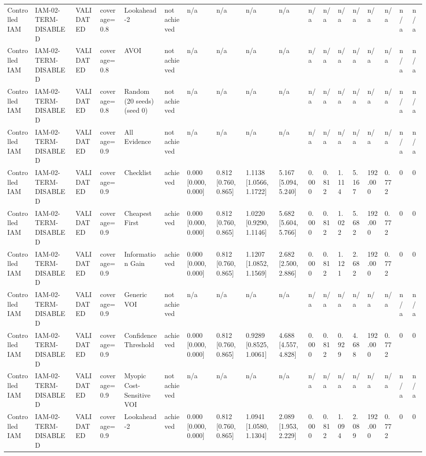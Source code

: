 \begin{table}[!ht]
{\begin{tabular}{llllllllllllllllll}
Controlled IAM & IAM-02-TERM-DISABLED & VALIDATED & coverage=0.8 & Lookahead-2 & not achieved & n/a & n/a & n/a & n/a & n/a & n/a & n/a & n/a & n/a & n/a & n/a & n/a \\
Controlled IAM & IAM-02-TERM-DISABLED & VALIDATED & coverage=0.8 & AVOI & not achieved & n/a & n/a & n/a & n/a & n/a & n/a & n/a & n/a & n/a & n/a & n/a & n/a \\
Controlled IAM & IAM-02-TERM-DISABLED & VALIDATED & coverage=0.8 & Random (20 seeds) (seed 0) & not achieved & n/a & n/a & n/a & n/a & n/a & n/a & n/a & n/a & n/a & n/a & n/a & n/a \\
Controlled IAM & IAM-02-TERM-DISABLED & VALIDATED & coverage=0.9 & All Evidence & not achieved & n/a & n/a & n/a & n/a & n/a & n/a & n/a & n/a & n/a & n/a & n/a & n/a \\
Controlled IAM & IAM-02-TERM-DISABLED & VALIDATED & coverage=0.9 & Checklist & achieved & 0.000 [0.000, 0.000] & 0.812 [0.760, 0.865] & 1.1138 [1.0566, 1.1722] & 5.167 [5.094, 5.240] & 0.000 & 0.812 & 1.114 & 5.167 & 192.000 & 0.772 & 0 & 0 \\
Controlled IAM & IAM-02-TERM-DISABLED & VALIDATED & coverage=0.9 & Cheapest First & achieved & 0.000 [0.000, 0.000] & 0.812 [0.760, 0.865] & 1.0220 [0.9290, 1.1146] & 5.682 [5.604, 5.766] & 0.000 & 0.812 & 1.022 & 5.682 & 192.000 & 0.772 & 0 & 0 \\
Controlled IAM & IAM-02-TERM-DISABLED & VALIDATED & coverage=0.9 & Information Gain & achieved & 0.000 [0.000, 0.000] & 0.812 [0.760, 0.865] & 1.1207 [1.0852, 1.1569] & 2.682 [2.500, 2.886] & 0.000 & 0.812 & 1.121 & 2.682 & 192.000 & 0.772 & 0 & 0 \\
Controlled IAM & IAM-02-TERM-DISABLED & VALIDATED & coverage=0.9 & Generic VOI & not achieved & n/a & n/a & n/a & n/a & n/a & n/a & n/a & n/a & n/a & n/a & n/a & n/a \\
Controlled IAM & IAM-02-TERM-DISABLED & VALIDATED & coverage=0.9 & Confidence Threshold & achieved & 0.000 [0.000, 0.000] & 0.812 [0.760, 0.865] & 0.9289 [0.8525, 1.0061] & 4.688 [4.557, 4.828] & 0.000 & 0.812 & 0.929 & 4.688 & 192.000 & 0.772 & 0 & 0 \\
Controlled IAM & IAM-02-TERM-DISABLED & VALIDATED & coverage=0.9 & Myopic Cost-Sensitive VOI & not achieved & n/a & n/a & n/a & n/a & n/a & n/a & n/a & n/a & n/a & n/a & n/a & n/a \\
Controlled IAM & IAM-02-TERM-DISABLED & VALIDATED & coverage=0.9 & Lookahead-2 & achieved & 0.000 [0.000, 0.000] & 0.812 [0.760, 0.865] & 1.0941 [1.0580, 1.1304] & 2.089 [1.953, 2.229] & 0.000 & 0.812 & 1.094 & 2.089 & 192.000 & 0.772 & 0 & 0 \\

\end{tabular}}
\end{table}
